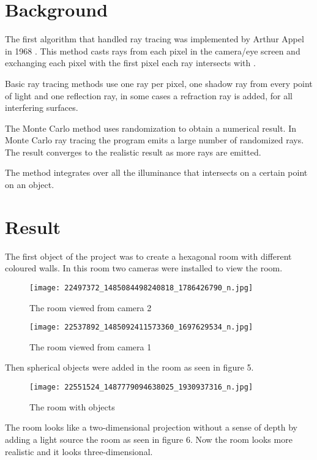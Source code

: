 \documentclass[a4paper,12pt]{IEEEtran}
\begin{document}
\section{Background}

The first algorithm that handled ray tracing was implemented by Arthur Appel in 1968 \cite{Arthur Appel}. This method casts rays from each pixel in the camera/eye screen and exchanging each pixel with the first pixel each ray intersects with \cite{Basic Raytracing}. 

Basic ray tracing methods use one ray per pixel, one shadow ray from every point of light and one reflection ray, in some cases a refraction ray is added, for all interfering surfaces.


The Monte Carlo method uses randomization to obtain a numerical result. 
In Monte Carlo ray tracing the program emits a large number of randomized rays. The result converges to the realistic result as more rays are emitted\cite{Monte Carlo Method}.


The method integrates over all the illuminance that intersects on a certain point on an object\cite{Path tracing}.  
\section{Result}

The first object of the project was to create a hexagonal room with different coloured walls. In this room two cameras were installed to view the room. 
\begin{figure}[h!]
\texttt{[image: 22497372\_1485084498240818\_1786426790\_n.jpg]}
\caption{The room viewed from camera 2}
\end{figure}

\begin{figure}[h!]
\texttt{[image: 22537892\_1485092411573360\_1697629534\_n.jpg]}
\caption{The room viewed from camera 1}
\end{figure}
Then spherical objects were added in the room as seen in figure 5. 

\begin{figure}[h!]
\texttt{[image: 22551524\_1487779094638025\_1930937316\_n.jpg]}
\caption{The room with objects}
\end{figure}

The room looks like a two-dimensional projection without a sense of depth by adding a light source the room as seen in figure 6. Now the room looks more realistic and it looks three-dimensional. 
\end{document}

